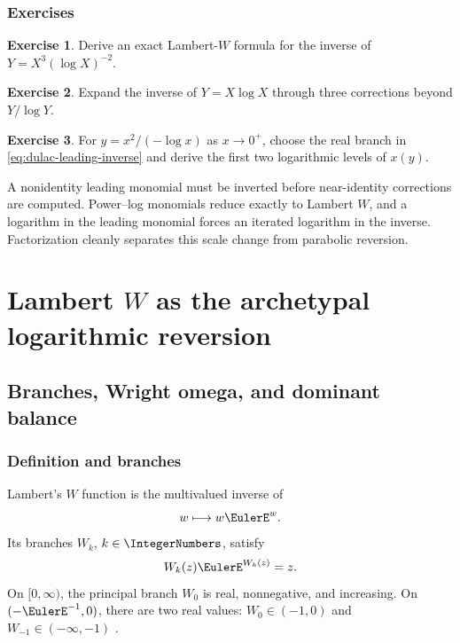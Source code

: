 \documentclass[11pt,openany]{book}
\theoremstyle{definition}
\newtheorem{exercise}{Exercise}[chapter]
\theoremstyle{plain}
\theoremstyle{remark}
\begin{document}
\section{Exercises}
\begin{exercise}
Derive an exact Lambert-\(W\) formula for the inverse of \(Y=X^3(\log X)^{-2}\).
\end{exercise}
\begin{exercise}
Expand the inverse of \(Y=X\log X\) through three corrections beyond \(Y/\log Y\).
\end{exercise}
\begin{exercise}
For \(y=x^2/(-\log x)\) as \(x\to0^+\), choose the real branch in \cref{eq:dulac-leading-inverse} and derive the first two logarithmic levels of \(x(y)\).
\end{exercise}

\begin{summarybox}
A nonidentity leading monomial must be inverted before near-identity corrections are computed. Power--log monomials reduce exactly to Lambert \(W\), and a logarithm in the leading monomial forces an iterated logarithm in the inverse. Factorization cleanly separates this scale change from parabolic reversion.
\end{summarybox}

\part{Lambert \texorpdfstring{\(W\)}{W} as the archetypal logarithmic reversion}\label{part:lambert}

\chapter{Branches, Wright omega, and dominant balance}\label{ch:W-branches}

\section{Definition and branches}
Lambert's \(W\) function is the multivalued inverse of
\[
 w\longmapsto w\EulerE^w.
\]
Its branches \(W_k\), \(k\in\IntegerNumbers\), satisfy
\begin{equation}\label{eq:W-definition}
 W_k(z)\EulerE^{W_k(z)}=z.
\end{equation}
On \([0,\infty)\), the principal branch \(W_0\) is real, nonnegative, and increasing. On \((-\EulerE^{-1},0)\), there are two real values: \(W_0\in(-1,0)\) and \(W_{-1}\in(-\infty,-1)\) \cite{corless-W,dlmf-W}.
\end{document}
